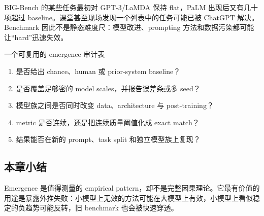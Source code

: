 BIG-Bench 的某些任务最初对 GPT-3/LaMDA 保持 flat，PaLM 出现后又有几十项超过 baseline。课堂甚至现场发现一个列表中的任务可能已被 ChatGPT 解决。Benchmark 因此不是静态难度尺：模型改进、prompting 方法和数据污染都可能让“hard”迅速失效。

\begin{importantbox}{一个可复用的 emergence 审计表}
\begin{enumerate}
  \item 是否给出 chance、human 或 prior-system baseline？
  \item 是否覆盖足够密的 model scales，并报告误差条或多 seed？
  \item 模型族之间是否同时改变 data、architecture 与 post-training？
  \item metric 是否连续，还是把连续质量阈值化成 exact match？
  \item 结果能否在新的 prompt、task split 和独立模型族上复现？
\end{enumerate}
\end{importantbox}

\subsection{本章小结}

Emergence 是值得测量的 empirical pattern，却不是完整因果理论。它最有价值的用途是暴露外推失败：小模型上无效的方法可能在大模型上有效，小模型上看似稳定的负趋势可能反转，旧 benchmark 也会被快速穿透。

